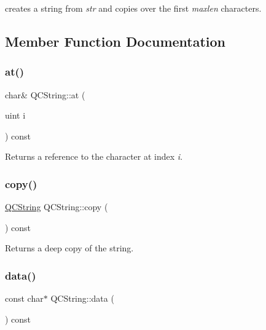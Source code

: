 creates a string from {\itshape str} and copies over the first {\itshape maxlen} characters. 

\subsection{Member Function Documentation}
\mbox{\label{class_q_c_string_a3917c144e26bc525d588c1dff602be00}} 
\subsubsection{\texorpdfstring{at()}{at()}}
{\footnotesize\ttfamily char\& Q\+C\+String\+::at (\begin{DoxyParamCaption}\item[{uint}]{i }\end{DoxyParamCaption}) const\hspace{0.3cm}{\ttfamily [inline]}}

Returns a reference to the character at index {\itshape i}. \mbox{\label{class_q_c_string_a78c5504b7c222e907fa0cd6e13391b05}} 
\subsubsection{\texorpdfstring{copy()}{copy()}}
{\footnotesize\ttfamily \mbox{\hyperlink{class_q_c_string}{Q\+C\+String}} Q\+C\+String\+::copy (\begin{DoxyParamCaption}{ }\end{DoxyParamCaption}) const\hspace{0.3cm}{\ttfamily [inline]}}

Returns a deep copy of the string. \mbox{\label{class_q_c_string_a84a5aa4da9147a687fa291c844fb5fc1}} 
\subsubsection{\texorpdfstring{data()}{data()}}
{\footnotesize\ttfamily const char$\ast$ Q\+C\+String\+::data (\begin{DoxyParamCaption}{ }\end{DoxyParamCaption}) const\hspace{0.3cm}{\ttfamily [inline]}}


